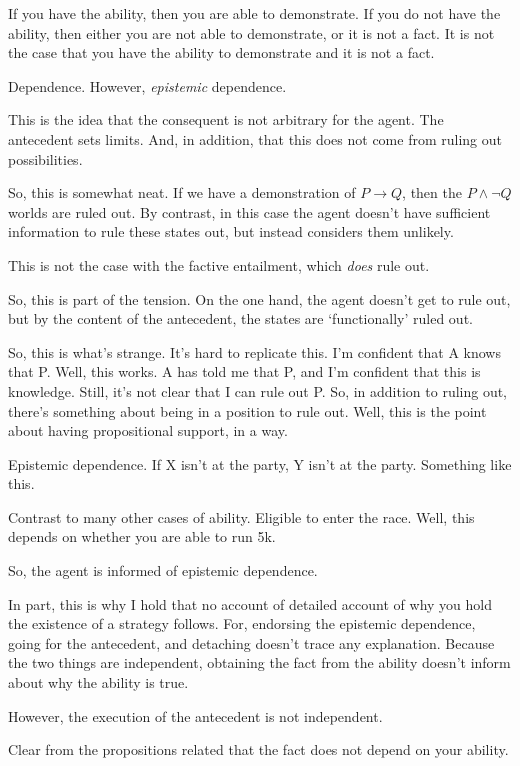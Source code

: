 \documentclass[10pt]{article}
\begin{document}
If you have the ability, then you are able to demonstrate.
If you do not have the ability, then either you are not able to demonstrate, or it is not a fact.
It is not the case that you have the ability to demonstrate and it is not a fact.

{
  \color{red}
  Dependence.
}
However, \emph{epistemic} dependence.

This is the idea that the consequent is not arbitrary for the agent.
The antecedent sets limits.
And, in addition, that this does not come from ruling out possibilities.

So, this is somewhat neat.
If we have a demonstration of \(P \rightarrow Q\), then the \(P \land \lnot Q\) worlds are ruled out.
By contrast, in this case the agent doesn't have sufficient information to rule these states out, but instead considers them unlikely.

This is not the case with the factive entailment, which \emph{does} rule out.

So, this is part of the tension.
On the one hand, the agent doesn't get to rule out, but by the content of the antecedent, the states are `functionally' ruled out.

So, this is what's strange.
It's hard to replicate this.
I'm confident that A knows that P.
Well, this works.
A has told me that P, and I'm confident that this is knowledge.
Still, it's not clear that I can rule out P.
So, in addition to ruling out, there's something about being in a position to rule out.
Well, this is the point about having propositional support, in a way.


Epistemic dependence.
If X isn't at the party, Y isn't at the party.
Something like this.


Contrast to many other cases of ability.
Eligible to enter the race.
Well, this depends on whether you are able to run 5k.

So, the agent is informed of epistemic dependence.

In part, this is why I hold that no account of detailed account of why you hold the existence of a strategy follows.
For, endorsing the epistemic dependence, going for the antecedent, and detaching doesn't trace any explanation.
Because the two things are independent, obtaining the fact from the ability doesn't inform about why the ability is true.

However, the execution of the antecedent is not independent.

Clear from the propositions related that the fact does not depend on your ability.
\end{document}
